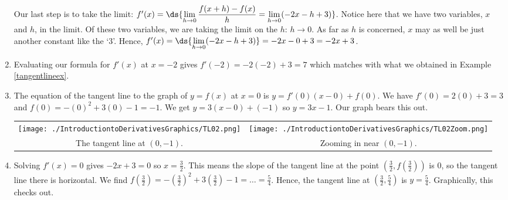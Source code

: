 \documentclass{ximera}
\begin{document}
\begin{example}
\begin{enumerate}
Our last step is to take the limit:   $f'(x) = \ds{ \lim_{h \rightarrow 0} \dfrac{f(x+h) - f(x)}{h} = \lim_{h \rightarrow 0} (-2x-h+3)}$.  Notice here that we have two variables, $x$ and $h$, in the limit.  Of these two variables, we are taking the limit on the $h$:  $h \rightarrow 0$.  As far as $h$ is concerned, $x$ may as well be just another constant like the `$3$'.  Hence, $f'(x) = \ds{ \lim_{h \rightarrow 0} (-2x-h+3)}=  -2x - 0 + 3 = -2x+3$.

\item  Evaluating our formula for $f'(x)$ at $x = -2$ gives $f'(-2) = -2(-2) + 3 = 7$ which matches with what we obtained in Example \ref{tangentlineex}.

\item The equation of the tangent line to the graph of $y = f(x)$ at $x = 0$ is $y = f'(0) (x - 0) + f(0)$.  We have $f'(0)=2(0) + 3 = 3$ and $f(0) = -(0)^2+3(0)-1 = -1$.  We get $y = 3(x-0)+(-1)$ so $y = 3x-1$. Our graph bears this out.

\begin{center}

\begin{tabular}{cc}

 \texttt{[image: ./IntroductiontoDerivativesGraphics/TL02.png]} &  \texttt{[image: ./IntroductiontoDerivativesGraphics/TL02Zoom.png]}  \\
 
 The tangent line at $(0,-1)$. & Zooming in near $(0, -1)$.  \\
 
 \end{tabular}
 
 \end{center}
 
 \item  Solving $f'(x) = 0$ gives $-2x+3 = 0$ so $x = \frac{3}{2}$.  This means the slope of the tangent line at the point $\left(\frac{3}{2}, f\left(\frac{3}{2}\right) \right)$ is $0$, so the tangent line there is horizontal.  We find 
 $f\left(\frac{3}{2}\right) = -\left( \frac{3}{2}\right)^2 + 3\left(\frac{3}{2}\right) - 1 = \ldots = \frac{5}{4}$.  Hence, the tangent line at  $\left(\frac{3}{2}, \frac{5}{4} \right)$ is $y = \frac{5}{4}$.  Graphically, this checks out.
 
 
 
\begin{center}

\begin{tabular}{cc}


\end{tabular}
\end{center}
\end{enumerate}
\end{example}
\end{document}

